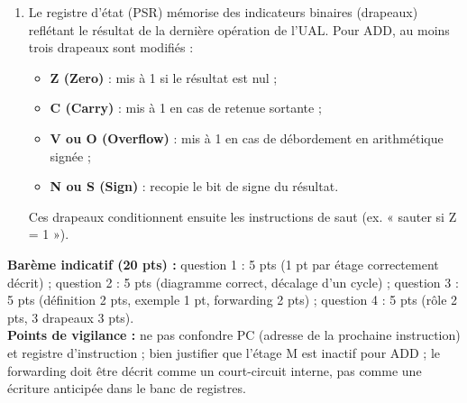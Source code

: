 \documentclass[11pt]{article}
\newcommand{\cle}[1]{{\popxbold\color{popdark}#1}}
\begin{document}
\begin{corrige}
\begin{enumerate}
    \item Le \cle{registre d'état} (PSR) mémorise des indicateurs binaires (drapeaux) reflétant le résultat de la dernière opération de l'UAL. Pour ADD, au moins trois drapeaux sont modifiés :
    \begin{itemize}
        \item \textbf{Z (Zero)} : mis à 1 si le résultat est nul ;
        \item \textbf{C (Carry)} : mis à 1 en cas de retenue sortante ;
        \item \textbf{V ou O (Overflow)} : mis à 1 en cas de débordement en arithmétique signée ;
        \item \textbf{N ou S (Sign)} : recopie le bit de signe du résultat.
    \end{itemize}
    Ces drapeaux conditionnent ensuite les instructions de saut (ex. « sauter si Z = 1 »).
\end{enumerate}
\textbf{Barème indicatif (20 pts) :} question 1 : 5 pts (1 pt par étage correctement décrit) ; question 2 : 5 pts (diagramme correct, décalage d'un cycle) ; question 3 : 5 pts (définition 2 pts, exemple 1 pt, forwarding 2 pts) ; question 4 : 5 pts (rôle 2 pts, 3 drapeaux 3 pts).\\
\textbf{Points de vigilance :} ne pas confondre PC (adresse de la prochaine instruction) et registre d'instruction ; bien justifier que l'étage M est inactif pour ADD ; le forwarding doit être décrit comme un court-circuit interne, pas comme une écriture anticipée dans le banc de registres.
\end{corrige}
\end{document}
